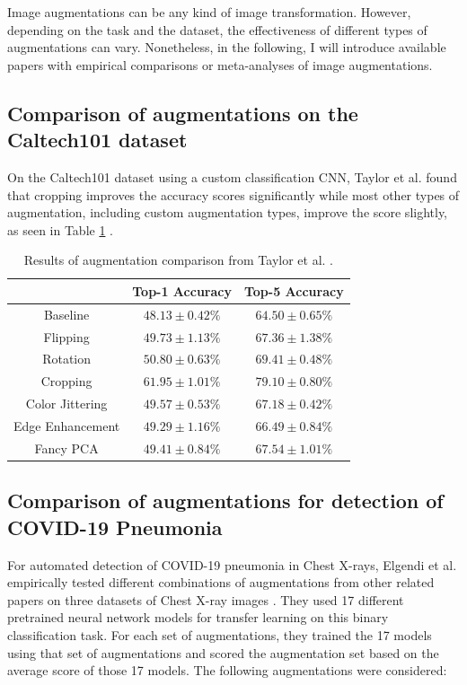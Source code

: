 \documentclass[10pt]{book}
\begin{document}
Image augmentations can be any kind of image transformation. However, depending on the task and the dataset, the effectiveness of different types of augmentations can vary. Nonetheless, in the following, I will introduce available papers with empirical comparisons or meta-analyses of image augmentations.

\subsection{Comparison of augmentations on the Caltech101 dataset}

On the Caltech101 dataset using a custom classification \ac{CNN}, Taylor et al. found that cropping improves the accuracy scores significantly while most other types of augmentation, including custom augmentation types, improve the score slightly, as seen in Table \ref{tab:taylor-acc} \cite{8628742}. %

\begin{table}
  \begin{tabular}{ c c c }
    & Top-1 Accuracy & Top-5 Accuracy \\ 
   \hline
   Baseline & $48.13 \pm 0.42\%$ & $64.50 \pm 0.65\%$ \\
   Flipping & $49.73 \pm 1.13\%$ & $67.36 \pm 1.38\%$ \\
   Rotation & $50.80 \pm 0.63\%$ & $69.41 \pm 0.48\%$ \\
   Cropping & $61.95 \pm 1.01\%$ & $79.10 \pm 0.80\%$ \\
   Color Jittering & $49.57 \pm 0.53\%$ & $67.18 \pm 0.42\%$ \\
   Edge Enhancement & $49.29 \pm 1.16\%$ & $66.49 \pm 0.84\%$ \\
   Fancy PCA & $49.41 \pm 0.84\%$ & $67.54 \pm 1.01\%$ \\
   \hline
  \end{tabular}
  \caption{\label{tab:taylor-acc}Results of augmentation comparison from Taylor et al. \cite{8628742}.}
\end{table}

\subsection{Comparison of augmentations for detection of COVID-19 Pneumonia}

For automated detection of COVID-19 pneumonia in Chest X-rays, Elgendi et al. empirically tested different combinations of augmentations from other related papers on three datasets 
of Chest X-ray images \cite{elgendi2021effectiveness}. They used 17 different pretrained neural network models for transfer learning on this binary classification task. For each set of augmentations, they trained the 17 models using that set of augmentations and scored the augmentation set based on the average score of those 17 models. The following augmentations were considered:
\end{document}
